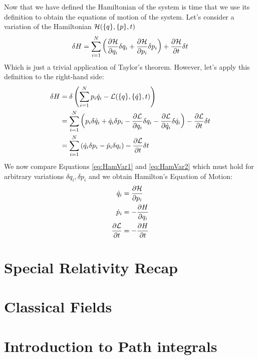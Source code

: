 \vspace{1mm}\noindent Now that we have defined the Hamiltonian of the system is time that we use its definition to obtain the equations of motion of the system. Let's consider a variation of the Hamiltonian $\mathcal{H}(\{q\},\{p\},t)$
\begin{equation}
    \delta H =\sum_{i=1}^N \left(\frac{\partial \mathcal{H}}{\partial q_i}\delta q_i + \frac{\partial \mathcal{H}}{\partial p_i}\delta p_i\right) + \frac{\partial \mathcal{H}}{\partial t}\delta t  
    \label{eq:HamVar1}
\end{equation}
Which is just a trivial application of Taylor's theorem. However, let's apply this definition to the right-hand side:
\begin{align}
     \delta H &= \delta\left( \sum_{i=1}^{N} p_i \dot q_i - \mathcal{L}(\{q\},\{\dot q\},t)\right)\\
     &= \sum_{i=1}^{N} \left( p_i \delta \dot q_i + \dot q_i \delta p_i - \frac{\partial\mathcal{L}}{\partial q_i}\delta q_i - \frac{\partial\mathcal{L}}{\partial \dot q_i} \delta \dot q_i\right) - \frac{\partial \mathcal{L}}{\partial t}\delta t\\
      &=\sum_{i=1}^{N} \left(  \dot q_i \delta p_i - \dot p_i \delta  q_i\right) - \frac{\partial \mathcal{L}}{\partial t}\delta t
      \label{eq:HamVar2}
\end{align}
We now compare Equations \ref{eq:HamVar1} and \ref{eq:HamVar2} which must hold for arbitrary variations $\delta q_i,\delta p_i$ and we obtain Hamilton's Equation of Motion:
\begin{align}
    \dot q_i &= \frac{\partial \mathcal{H}}{\partial p_i}\\
    \dot p_i &= -\frac{\partial H}{\partial q_i}\\
    \frac{\partial \mathcal{L}}{\partial t} &= -\frac{\partial H}{\partial t}
\end{align}
\section{Special Relativity Recap}
\section{Classical Fields}
\section{Introduction to Path integrals}
